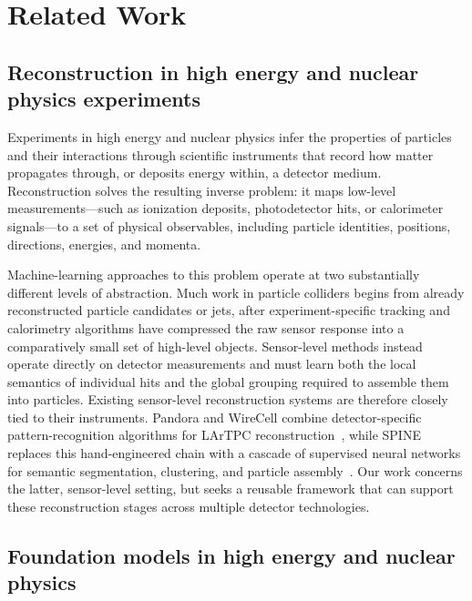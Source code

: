 \appendix

\section{Related Work}
\label{app:related_work}

\subsection{Reconstruction in high energy and nuclear physics experiments}

Experiments in high energy and nuclear physics infer the properties of particles and their interactions through scientific instruments that record how matter propagates through, or deposits energy within, a detector medium. Reconstruction solves the resulting inverse problem: it maps low-level measurements---such as ionization deposits, photodetector hits, or calorimeter signals---to a set of physical observables, including particle identities, positions, directions, energies, and momenta.

Machine-learning approaches to this problem operate at two substantially different levels of abstraction. Much work in particle colliders begins from already reconstructed particle candidates or jets, after experiment-specific tracking and calorimetry algorithms have compressed the raw sensor response into a comparatively small set of high-level objects. Sensor-level methods instead operate directly on detector measurements and must learn both the local semantics of individual hits and the global grouping required to assemble them into particles. Existing sensor-level reconstruction systems are therefore closely tied to their instruments. Pandora and WireCell combine detector-specific pattern-recognition algorithms for LArTPC reconstruction~\citep{Acciarri2018,Abratenko_2022}, while SPINE replaces this hand-engineered chain with a cascade of supervised neural networks for semantic segmentation, clustering, and particle assembly~\citep{drielsma2021scalableendtoenddeeplearningbaseddata}. Our work concerns the latter, sensor-level setting, but seeks a reusable framework that can support these reconstruction stages across multiple detector technologies.

\subsection{Foundation models in high energy and nuclear physics}

